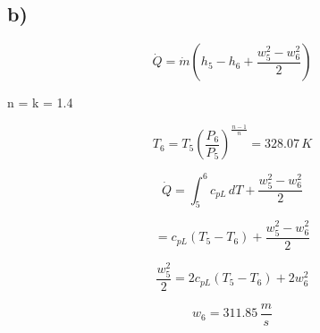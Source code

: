 

\subsection*{b)}

\[
\dot{Q} = \dot{m}(h_5 - h_6 + \frac{w_5^2 - w_6^2}{2})
\]

 \Rightarrow n = k = 1.4

\[
T_6 = T_5 \left( \frac{P_6}{P_5} \right)^{\frac{n-1}{n}} = 328.07 \, K
\]

\[
\dot{Q} = \int_{5}^{6} c_{pL} \, dT + \frac{w_5^2 - w_6^2}{2}
\]

\[
= c_{pL}(T_5 - T_6) + \frac{w_5^2 - w_6^2}{2}
\]

\[
\frac{w_5^2}{2} = 2 c_{pL}(T_5 - T_6) + 2 w_6^2
\]

\[
w_6 = 311.85 \, \frac{m}{s}
\]
